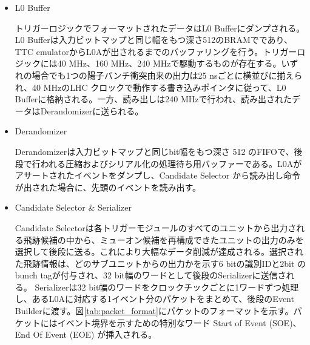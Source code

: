 \begin{itemize}
    \item L0 Buffer　　
    \par
    トリガーロジックでフォーマットされたデータはL0 Bufferにダンプされる。L0 Bufferは入力ビットマップと同じ幅をもつ深さ512のBRAMでであり、TTC emulatorからL0Aが出されるまでのバッファリングを行う。トリガーロジックには40 MHz、160 MHz、240 MHzで駆動するものが存在する。いずれの場合でも1つの陽子バンチ衝突由来の出力は25 nsごとに横並びに揃えられ、40 MHzのLHC クロックで動作する書き込みポインタに従って、L0 Bufferに格納される。一方、読み出しは240 MHzで行われ、読み出されたデータはDerandomizerに送られる。

    \item Derandomizer　　
    \par
    Derandomizerは入力ビットマップと同じbit幅をもつ深さ 512 のFIFOで、後段で行われる圧縮およびシリアル化の処理待ち用バッファーである。L0Aがアサートされたイベントをダンプし、Candidate Selector から読み出し命令が出された場合に、先頭のイベントを読み出す。

    \item Candidate Selector \& Serializer　　
    \par
    Candidate Selectorは各トリガーモジュールのすべてのユニットから出力される飛跡候補の中から、ミューオン候補を再構成できたユニットの出力のみを選択して後段に送る。これにより大幅なデータ削減が達成される。選択された飛跡情報は、どのサブユニットからの出力かを示す6 bitの識別IDと2bit のbunch tagが付与され、32 bit幅のワードとして後段のSerializerに送信される。
    Serializerは32 bit幅のワードをクロックチックごとに1ワードずつ処理し、あるL0Aに対応する1イベント分のパケットをまとめて、後段のEvent Builderに渡す。図\ref{tab:packet_format}にパケットのフォーマットを示す。パケットにはイベント境界を示すための特別なワード Start of Event (SOE)、End Of Event (EOE) が挿入される。
    

\end{itemize}
